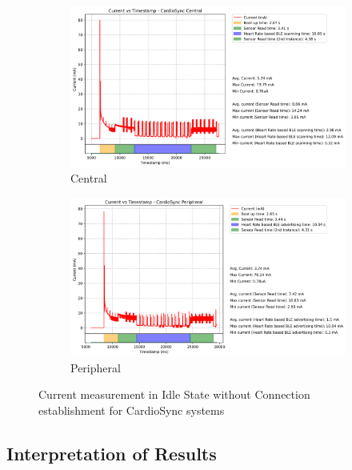 \begin{figure}[H]
    \centering
    \begin{subfigure}{0.85\linewidth}        
        \centering
        \includegraphics[width=\linewidth]{chapters/Results/Current vs Timestamp - CardioSync Central.png}
        \caption{Central}
        \label{fig:current_cardiosync_central}
    \end{subfigure}
    \begin{subfigure}{0.85\linewidth}    
        \centering
        \includegraphics[width=\linewidth]{chapters/Results/Current vs Timestamp - CardioSync Peripheral.png}
        \caption{Peripheral}
        \label{fig:current_cardiosync_peripheral}
    \end{subfigure}
    \caption{Current measurement in Idle State without Connection establishment for CardioSync systems}
\end{figure}

\subsection{Interpretation of Results}

